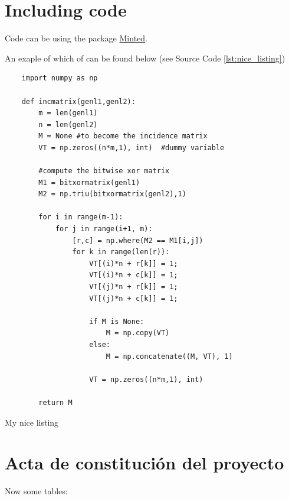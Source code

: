 \section{Including code}

Code can be using the package
\href{https://www.sharelatex.com/learn/Code\_Highlighting\_with\_minted}{Minted}.

An exaple of which of can be found below (see Source Code \ref{lst:nice_listing})
\begin{listing}
	\begin{verbatim}
	import numpy as np

	def incmatrix(genl1,genl2):
	    m = len(genl1)
	    n = len(genl2)
	    M = None #to become the incidence matrix
	    VT = np.zeros((n*m,1), int)  #dummy variable

	    #compute the bitwise xor matrix
	    M1 = bitxormatrix(genl1)
	    M2 = np.triu(bitxormatrix(genl2),1)

	    for i in range(m-1):
	        for j in range(i+1, m):
	            [r,c] = np.where(M2 == M1[i,j])
	            for k in range(len(r)):
	                VT[(i)*n + r[k]] = 1;
	                VT[(i)*n + c[k]] = 1;
	                VT[(j)*n + r[k]] = 1;
	                VT[(j)*n + c[k]] = 1;

	                if M is None:
	                    M = np.copy(VT)
	                else:
	                    M = np.concatenate((M, VT), 1)

	                VT = np.zeros((n*m,1), int)

	    return M
	\end{verbatim}

  \caption{My nice listing}
  \label{lst:nice_listing}
\end{listing}

\section{Acta de constitución del proyecto}
\label{section:acta}

Now some tables:


